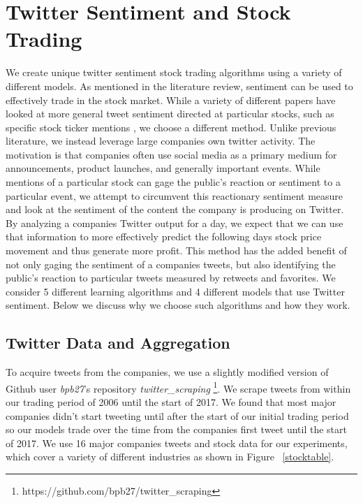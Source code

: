\documentclass[../thesis.tex]{subfiles}
\begin{document}
\chapter{Twitter Sentiment and Stock Trading}
\label{ch:pruning}

We create unique twitter sentiment stock trading algorithms using a variety of different models. As mentioned in the literature review, sentiment can be used to effectively trade in the stock market. While a variety of different papers have looked at more general tweet sentiment directed at particular stocks, such as specific stock ticker mentions \cite{Mao2013}, we choose a different method. Unlike previous literature, we instead leverage large companies own twitter activity. The motivation is that companies often use social media as a primary medium for announcements, product launches, and generally important events. While mentions of a particular stock can gage the public's reaction or sentiment to a particular event, we attempt to circumvent this reactionary sentiment measure and look at the sentiment of the content the company is producing on Twitter. By analyzing a companies Twitter output for a day, we expect that we can use that information to more effectively predict the following days stock price movement and thus generate more profit. This method has the added benefit of not only gaging the sentiment of a companies tweets, but also identifying the public's reaction to particular tweets measured by retweets and favorites. We consider 5 different learning algorithms and 4 different models that use Twitter sentiment. Below we discuss why we choose such algorithms and how they work.

\section{Twitter Data and Aggregation}

To acquire tweets from the companies, we use a slightly modified version of Github user \textit{bpb27}'s repository \textit{twitter\_scraping} \footnote{https://github.com/bpb27/twitter\_scraping}. We scrape tweets from within our trading period of 2006 until the start of 2017. We found that most major companies didn't start tweeting until after the start of our initial trading period so our models trade over the time from the companies first tweet until the start of 2017. We use 16 major companies tweets and stock data for our experiments, which cover a variety of different industries as shown in Figure ~\ref{stocktable}. 
\end{document}
